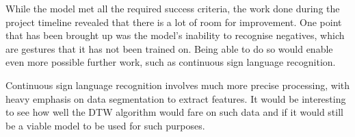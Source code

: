 \documentclass[final,rdr32.tex]{subfiles}
\begin{document}
While the model met all the required success criteria, the work done during the project timeline revealed that there is a lot of room for improvement. One point that has been brought up was the model's inability to recognise negatives, which are gestures that it has not been trained on. Being able to do so would enable even more possible further work, such as continuous sign language recognition.

Continuous sign language recognition involves much more precise processing, with heavy emphasis on data segmentation to extract features. It would be interesting to see how well the DTW algorithm would fare on such data and if it would still be a viable model to be used for such purposes.
\end{document}
